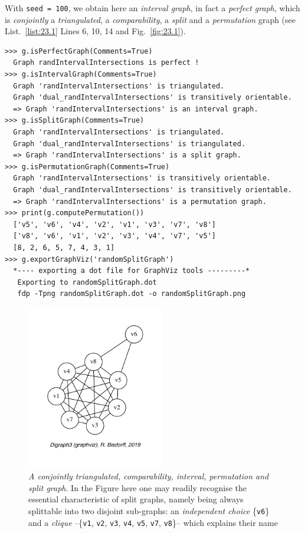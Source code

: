 With \texttt{seed = 100}, we obtain here an \emph{interval graph}, in fact a \emph{perfect graph}, which is \emph{conjointly} a \emph{triangulated}, a \emph{comparability}, a \emph{split} and a \emph{permutation} graph (see List.~\vref{list:23.1} Lines 6, 10, 14 and Fig.~\vref{fig:23.1}).
\begin{lstlisting}[caption={Testing perfect graph categories.},label=list:23.1,basicstyle=\ttfamily\scriptsize]
>>> g.isPerfectGraph(Comments=True)
  Graph randIntervalIntersections is perfect !
>>> g.isIntervalGraph(Comments=True)
  Graph 'randIntervalIntersections' is triangulated.
  Graph 'dual_randIntervalIntersections' is transitively orientable.
  => Graph 'randIntervalIntersections' is an interval graph.
>>> g.isSplitGraph(Comments=True)
  Graph 'randIntervalIntersections' is triangulated.
  Graph 'dual_randIntervalIntersections' is triangulated.
  => Graph 'randIntervalIntersections' is a split graph.
>>> g.isPermutationGraph(Comments=True)
  Graph 'randIntervalIntersections' is transitively orientable.
  Graph 'dual_randIntervalIntersections' is transitively orientable.
  => Graph 'randIntervalIntersections' is a permutation graph.
>>> print(g.computePermutation())
  ['v5', 'v6', 'v4', 'v2', 'v1', 'v3', 'v7', 'v8']
  ['v8', 'v6', 'v1', 'v2', 'v3', 'v4', 'v7', 'v5']
  [8, 2, 6, 5, 7, 4, 3, 1]
>>> g.exportGraphViz('randomSplitGraph')
  *---- exporting a dot file for GraphViz tools ---------*
   Exporting to randomSplitGraph.dot
   fdp -Tpng randomSplitGraph.dot -o randomSplitGraph.png
\end{lstlisting}
\begin{figure}[ht]
\sidecaption[t]
\includegraphics[width=6cm]{Figures/23-1-randomSplitGraph.pdf}
\caption[A conjointly triangulated, comparability, interval, permutation and split graph]{\emph{A conjointly triangulated, comparability, interval, permutation and split graph}. In the Figure here one may readily recognise the essential characteristic of split graphs, namely being always splittable into two disjoint sub-graphs: an \emph{independent choice} \{\texttt{v6}\} and a \emph{clique}  --\{\texttt{v1}, \texttt{v2}, \texttt{v3}, \texttt{v4}, \texttt{v5}, \texttt{v7}, \texttt{v8}\}-- which explains their name} 
\label{fig:23.1}       %
\end{figure}
